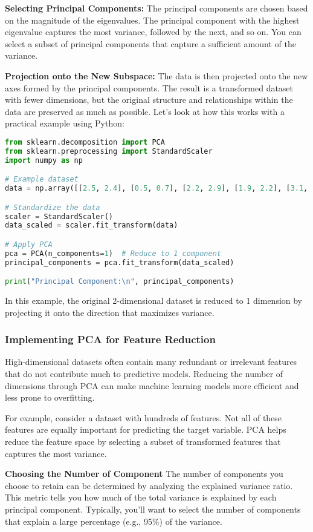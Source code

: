 \documentclass{article}
\begin{document}
\textbf{Selecting Principal Components:}
The principal components are chosen based on the magnitude of the eigenvalues. The principal component with the highest eigenvalue captures the most variance, followed by the next, and so on. You can select a subset of principal components that capture a sufficient amount of the variance.

\textbf{Projection onto the New Subspace:}
The data is then projected onto the new axes formed by the principal components. The result is a transformed dataset with fewer dimensions, but the original structure and relationships within the data are preserved as much as possible. Let’s look at how this works with a practical example using Python:

\begin{lstlisting}[language=Python]
from sklearn.decomposition import PCA
from sklearn.preprocessing import StandardScaler
import numpy as np

# Example dataset
data = np.array([[2.5, 2.4], [0.5, 0.7], [2.2, 2.9], [1.9, 2.2], [3.1, 3.0]])

# Standardize the data
scaler = StandardScaler()
data_scaled = scaler.fit_transform(data)

# Apply PCA
pca = PCA(n_components=1)  # Reduce to 1 component
principal_components = pca.fit_transform(data_scaled)

print("Principal Component:\n", principal_components)
\end{lstlisting}

In this example, the original 2-dimensional dataset is reduced to 1 dimension by projecting it onto the direction that maximizes variance.

\subsubsection{Implementing PCA for Feature Reduction}
High-dimensional datasets often contain many redundant or irrelevant features that do not contribute much to predictive models. Reducing the number of dimensions through PCA can make machine learning models more efficient and less prone to overfitting.

For example, consider a dataset with hundreds of features. Not all of these features are equally important for predicting the target variable. PCA helps reduce the feature space by selecting a subset of transformed features that captures the most variance.

\textbf{Choosing the Number of Component}
The number of components you choose to retain can be determined by analyzing the explained variance ratio. This metric tells you how much of the total variance is explained by each principal component. Typically, you’ll want to select the number of components that explain a large percentage (e.g., 95\%) of the variance.
\end{document}
